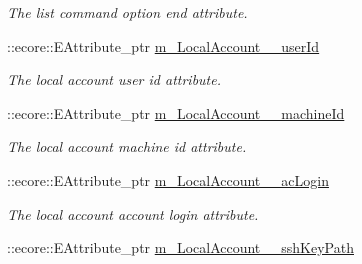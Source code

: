 \begin{DoxyCompactItemize}
\begin{DoxyCompactList}\small\item\em The list command option end attribute. \item\end{DoxyCompactList}\item 
\hypertarget{classUMS__Data_1_1UMS__DataPackage_ae072c6ff1652457b20e6035414a4212c}{
::ecore::EAttribute\_\-ptr \hyperlink{classUMS__Data_1_1UMS__DataPackage_ae072c6ff1652457b20e6035414a4212c}{m\_\-LocalAccount\_\-\_\-userId}}
\label{classUMS__Data_1_1UMS__DataPackage_ae072c6ff1652457b20e6035414a4212c}

\begin{DoxyCompactList}\small\item\em The local account user id attribute. \item\end{DoxyCompactList}\item 
\hypertarget{classUMS__Data_1_1UMS__DataPackage_ae5837389bce3b80baef80c1e4e5f48e4}{
::ecore::EAttribute\_\-ptr \hyperlink{classUMS__Data_1_1UMS__DataPackage_ae5837389bce3b80baef80c1e4e5f48e4}{m\_\-LocalAccount\_\-\_\-machineId}}
\label{classUMS__Data_1_1UMS__DataPackage_ae5837389bce3b80baef80c1e4e5f48e4}

\begin{DoxyCompactList}\small\item\em The local account machine id attribute. \item\end{DoxyCompactList}\item 
\hypertarget{classUMS__Data_1_1UMS__DataPackage_a71304b56224bef17e5cca14ec4371a19}{
::ecore::EAttribute\_\-ptr \hyperlink{classUMS__Data_1_1UMS__DataPackage_a71304b56224bef17e5cca14ec4371a19}{m\_\-LocalAccount\_\-\_\-acLogin}}
\label{classUMS__Data_1_1UMS__DataPackage_a71304b56224bef17e5cca14ec4371a19}

\begin{DoxyCompactList}\small\item\em The local account account login attribute. \item\end{DoxyCompactList}\item 
\hypertarget{classUMS__Data_1_1UMS__DataPackage_a64c4543e523ad7ee6f094ae321df22ec}{
::ecore::EAttribute\_\-ptr \hyperlink{classUMS__Data_1_1UMS__DataPackage_a64c4543e523ad7ee6f094ae321df22ec}{m\_\-LocalAccount\_\-\_\-sshKeyPath}}
\label{classUMS__Data_1_1UMS__DataPackage_a64c4543e523ad7ee6f094ae321df22ec}


\end{DoxyCompactItemize}
